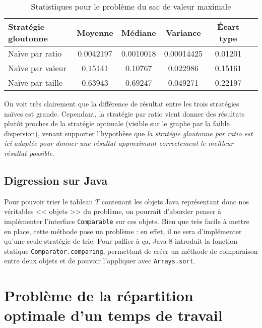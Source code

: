 \documentclass[a4paper,english,french]{article}
\begin{document}
\begin{center}
\begin{table}[htbp]
    \centering
    \begin{tabular}{lccccc}
        \toprule
        Stratégie gloutonne & Moyenne   & Médiane   & Variance      & Écart type    \\
        \midrule
        Naïve par ratio     & 0.0042197 & 0.0010018 & 0.00014425    & 0.01201     \\
        Naïve par valeur    & 0.15141 & 0.10767 & 0.022986    & 0.15161      \\
        Naïve par taille    & 0.63943 & 0.69247 & 0.049271    & 0.22197     \\
        \bottomrule
    \end{tabular}
    \caption{Statistiques pour le problème du sac de valeur maximale}
\end{table}
\end{center}

On voit très clairement que la différence de résultat entre les trois stratégies naïves est grande. Cependant, la stratégie par ratio vient donner des résultats plutôt proches de la stratégie optimale (visible sur le graphe par la faible dispersion), venant supporter l'hypothèse que \textit{la stratégie gloutonne par ratio est ici adaptée pour donner une résultat approximant correctement le meilleur résultat possible}.

\subsection*{Digression sur Java}

Pour pouvoir trier le tableau $T$ contenant les objets Java représentant donc nos véritables << objets >> du problème, on pourrait d'aborder penser à implémenter l'interface \texttt{Comparable} sur ces objets. Bien que très facile à mettre en place, cette méthode pose un problème : en effet, il ne sera d'implémenter qu'une seule stratégie de trie. Pour pallier à ça, Java 8 introduit la fonction statique \texttt{Comparator.comparing}, permettant de créer un méthode de comparaison entre deux objets et de pouvoir l'appliquer avec \texttt{Arrays.sort}.

\section{Problème de la répartition optimale d'un temps de travail} \label{sec:planning}
\end{document}

